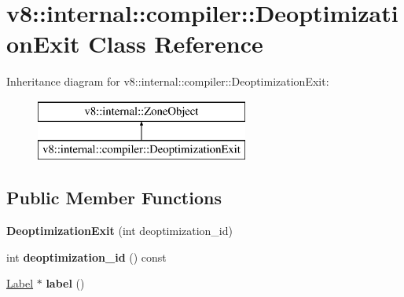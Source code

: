 \hypertarget{classv8_1_1internal_1_1compiler_1_1_deoptimization_exit}{}\section{v8\+:\+:internal\+:\+:compiler\+:\+:Deoptimization\+Exit Class Reference}
\label{classv8_1_1internal_1_1compiler_1_1_deoptimization_exit}
Inheritance diagram for v8\+:\+:internal\+:\+:compiler\+:\+:Deoptimization\+Exit\+:\begin{figure}[H]
\begin{center}
\leavevmode
\includegraphics[height=2.000000cm]{classv8_1_1internal_1_1compiler_1_1_deoptimization_exit}
\end{center}
\end{figure}
\subsection*{Public Member Functions}
\begin{DoxyCompactItemize}
\item 
{\bfseries Deoptimization\+Exit} (int deoptimization\+\_\+id)\hypertarget{classv8_1_1internal_1_1compiler_1_1_deoptimization_exit_a43a1b36a13637a606f52a1dbb45ed7e8}{}\label{classv8_1_1internal_1_1compiler_1_1_deoptimization_exit_a43a1b36a13637a606f52a1dbb45ed7e8}

\item 
int {\bfseries deoptimization\+\_\+id} () const \hypertarget{classv8_1_1internal_1_1compiler_1_1_deoptimization_exit_ab34488ca904802cec277847da156f1a8}{}\label{classv8_1_1internal_1_1compiler_1_1_deoptimization_exit_ab34488ca904802cec277847da156f1a8}

\item 
\hyperlink{classv8_1_1internal_1_1_label}{Label} $\ast$ {\bfseries label} ()\hypertarget{classv8_1_1internal_1_1compiler_1_1_deoptimization_exit_aacbab8bdac36acc53466bf51a48a1845}{}\label{classv8_1_1internal_1_1compiler_1_1_deoptimization_exit_aacbab8bdac36acc53466bf51a48a1845}

\end{DoxyCompactItemize}

